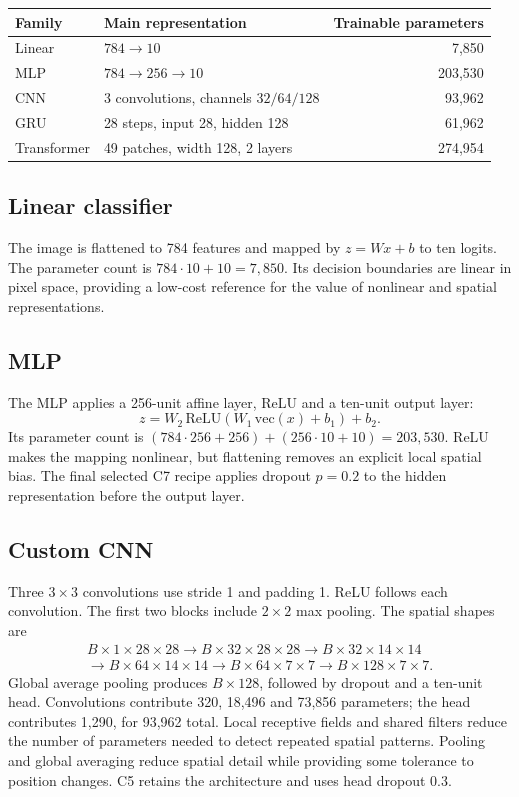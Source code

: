 \begin{center}
\small
\begin{tabular}{llr}
\toprule
Family & Main representation & Trainable parameters \\
\midrule
Linear & $784\rightarrow10$ & 7,850 \\
MLP & $784\rightarrow256\rightarrow10$ & 203,530 \\
CNN & 3 convolutions, channels $32/64/128$ & 93,962 \\
GRU & 28 steps, input 28, hidden 128 & 61,962 \\
Transformer & 49 patches, width 128, 2 layers & 274,954 \\
\bottomrule
\end{tabular}
\end{center}
\subsection{Linear classifier}
The image is flattened to 784 features and mapped by $z=Wx+b$ to ten logits. The parameter count is $784\cdot10+10=7,850$. Its decision boundaries are linear in pixel space, providing a low-cost reference for the value of nonlinear and spatial representations.

\subsection{MLP}
The MLP applies a 256-unit affine layer, ReLU and a ten-unit output layer:
\[
z=W_2\,\mathrm{ReLU}(W_1\,\mathrm{vec}(x)+b_1)+b_2.
\]
Its parameter count is $(784\cdot256+256)+(256\cdot10+10)=203,530$. ReLU makes the mapping nonlinear, but flattening removes an explicit local spatial bias. The final selected C7 recipe applies dropout $p=0.2$ to the hidden representation before the output layer.

\subsection{Custom CNN}
Three $3\times3$ convolutions use stride 1 and padding 1. ReLU follows each convolution. The first two blocks include $2\times2$ max pooling. The spatial shapes are
\[
\begin{split}
B\times1\times28\times28\rightarrow B\times32\times28\times28
\rightarrow B\times32\times14\times14\\
\rightarrow B\times64\times14\times14\rightarrow B\times64\times7\times7
\rightarrow B\times128\times7\times7.
\end{split}
\]
Global average pooling produces $B\times128$, followed by dropout and a ten-unit head. Convolutions contribute 320, 18,496 and 73,856 parameters; the head contributes 1,290, for 93,962 total. Local receptive fields and shared filters reduce the number of parameters needed to detect repeated spatial patterns. Pooling and global averaging reduce spatial detail while providing some tolerance to position changes. C5 retains the architecture and uses head dropout 0.3.

